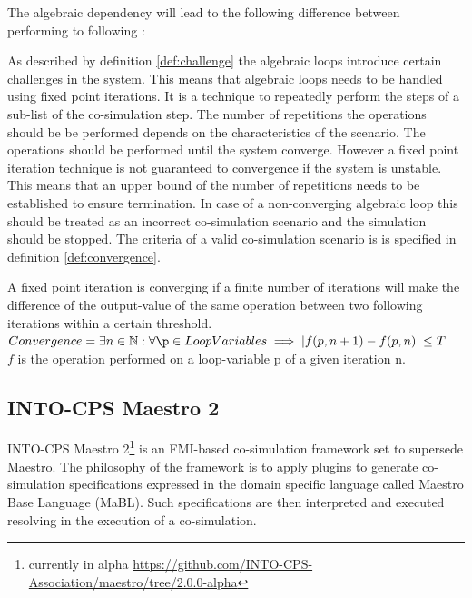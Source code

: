 \documentclass[runningheads]{llncs}
\begin{document}
\begin{definition}\label{def:challenge}
The algebraic dependency will lead to the following difference between performing to following :
\end{definition}

As described by definition \ref{def:challenge} the algebraic loops introduce certain challenges in the system. This means that algebraic loops needs to be handled using fixed point iterations\cite{Gomes2018}. It is a technique to repeatedly perform the steps of a sub-list of the co-simulation step. The number of repetitions the operations should be be performed depends on the characteristics of the scenario. The operations should be performed until the system converge.
However a fixed point iteration technique is not guaranteed to convergence if the system is unstable. This means that an upper bound of the number of repetitions needs to be established to ensure termination. In case of a non-converging algebraic loop this should be treated as an incorrect co-simulation scenario and the simulation should be stopped. The criteria of a valid co-simulation scenario is is specified in definition \ref{def:convergence}.

\begin{definition}\label{def:convergence}
A fixed point iteration is converging if a finite number of iterations will make the difference of the output-value of the same operation between two following iterations within a certain threshold.\\
$Convergence = \exists n \in \setnat: \forall \p \in LoopVariables \implies |f(p, n + 1) - f(p, n)| \leq T$\\
$f$ is the operation performed on a loop-variable p of a given iteration n.
\end{definition}


\subsection{INTO-CPS Maestro 2}
INTO-CPS Maestro 2\footnote{currently in alpha \url{https://github.com/INTO-CPS-Association/maestro/tree/2.0.0-alpha}}\cite{thule_maestro2_2019} is an FMI-based co-simulation framework set to supersede Maestro\cite{Maestro}. The philosophy of the framework is to apply plugins to generate co-simulation specifications expressed in the domain specific language called Maestro Base Language (MaBL). Such specifications are then interpreted and executed resolving in the execution of a co-simulation.
\end{document}
